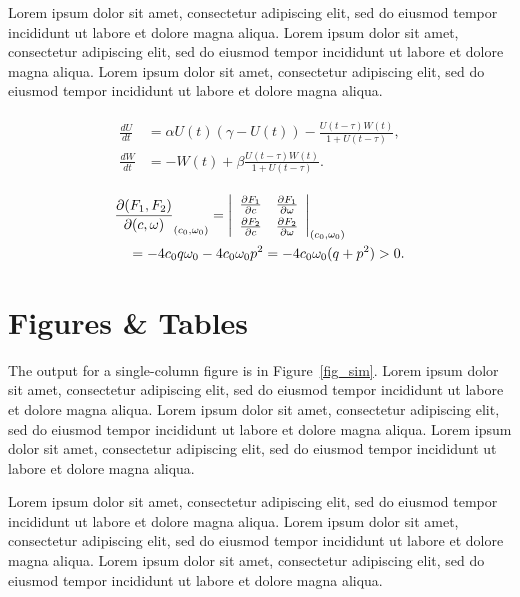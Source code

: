 \documentclass[
  journal=large,
  manuscript=article-type,
  year=2020,
  volume=37,
]{cup-journal}
\begin{document}
Lorem ipsum dolor sit amet, consectetur adipiscing elit, sed do eiusmod tempor incididunt ut labore et dolore magna aliqua. Lorem ipsum dolor sit amet, consectetur adipiscing elit, sed do eiusmod tempor incididunt ut labore et dolore magna aliqua. Lorem ipsum dolor sit amet, consectetur adipiscing elit, sed do eiusmod tempor incididunt ut labore et dolore magna aliqua. 

\begin{align}\label{eq:another}
\begin{split}
\frac{dU}{dt} &=\alpha U(t)(\gamma -U(t))-\frac{U(t-\tau)W(t)}{1+U(t-\tau)},\\
\frac{dW}{dt} &=-W(t)+\beta\frac{U(t-\tau)W(t)}{1+U(t-\tau)}.
\end{split}
\end{align}


\begin{align*}
&\frac{\partial(F_1,F_2)}{\partial(c,\omega)}_{(c_0,\omega_0)} = \left|
\begin{array}{ll}
\frac{\partial F_1}{\partial c} &\frac{\partial F_1}{\partial \omega} \\\noalign{\vskip3pt}
\frac{\partial F_2}{\partial c}&\frac{\partial F_2}{\partial \omega}
\end{array}\right|_{(c_0,\omega_0)}\\
&\quad=-4c_0q\omega_0 -4c_0\omega_0p^2 =-4c_0\omega_0(q+p^2)>0.
\end{align*}


\section{Figures \& Tables}

The output for a single-column figure is in Figure~\ref{fig_sim}.  Lorem ipsum dolor sit amet, consectetur adipiscing elit, sed do eiusmod tempor incididunt ut labore et dolore magna aliqua. Lorem ipsum dolor sit amet, consectetur adipiscing elit, sed do eiusmod tempor incididunt ut labore et dolore magna aliqua. Lorem ipsum dolor sit amet, consectetur adipiscing elit, sed do eiusmod tempor incididunt ut labore et dolore magna aliqua. 

Lorem ipsum dolor sit amet, consectetur adipiscing elit, sed do eiusmod tempor incididunt ut labore et dolore magna aliqua. Lorem ipsum dolor sit amet, consectetur adipiscing elit, sed do eiusmod tempor incididunt ut labore et dolore magna aliqua. Lorem ipsum dolor sit amet, consectetur adipiscing elit, sed do eiusmod tempor incididunt ut labore et dolore magna aliqua. 
\end{document}
